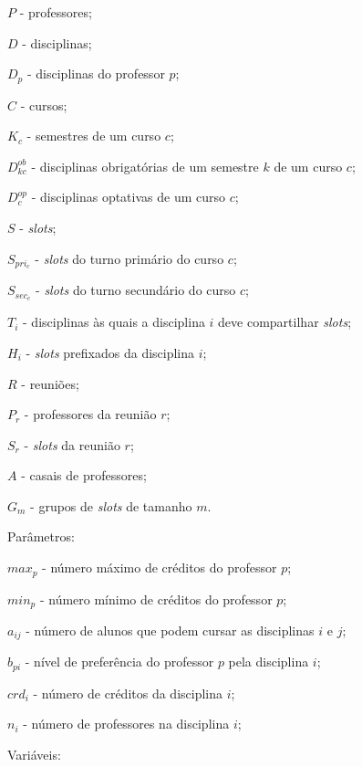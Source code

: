 \begin{alineascomponto}
    \item $P$ - professores;
    \item $D$ - disciplinas;
    \item $D_p$ - disciplinas do professor $p$;
    \item $C$ - cursos;
    \item $K_c$ - semestres de um curso $c$;
    \item $D_{kc}^{ob}$ - disciplinas obrigatórias de um semestre $k$ de um curso $c$;
    \item $D_{c}^{op}$ - disciplinas optativas de um curso $c$;
	\item $S$ - \textit{slots};
	\item $S_{pri_c}$ - \textit{slots} do turno primário do curso $c$;
	\item $S_{sec_c}$ - \textit{slots} do turno secundário do curso $c$;
	\item $T_i$ - disciplinas às quais a disciplina $i$ deve compartilhar \textit{slots};
	\item $H_i$ - \textit{slots} prefixados da disciplina $i$;
	\item $R$ - reuniões;
	\item $P_r$ - professores da reunião $r$;
	\item $S_r$ - \textit{slots} da reunião $r$;
	\item $A$ - casais de professores;
	\item $G_m$ - grupos de \textit{slots} de tamanho $m$.
\end{alineascomponto}

Parâmetros:

\begin{alineascomponto}
	\item $max_p$ - número máximo de créditos do professor $p$;
    \item $min_p$ - número mínimo de créditos do professor $p$;
	\item $a_{ij}$ - número de alunos que podem cursar as disciplinas $i$ e $j$;
	\item $b_{pi}$ - nível de preferência do professor $p$ pela disciplina $i$;	
	\item $crd_i$ - número de créditos da disciplina $i$;
	\item $n_i$ - número de professores na disciplina $i$;
\end{alineascomponto}

Variáveis:

